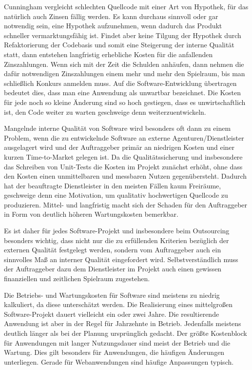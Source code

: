 Cunningham vergleicht schlechten Quellcode mit einer Art von Hypothek, für das natürlich auch Zinsen fällig werden. Es kann durchaus sinnvoll oder gar notwendig sein, eine Hypothek aufzunehmen, wenn dadurch das Produkt schneller vermarktungsfähig ist. Findet aber keine Tilgung der Hypothek durch Refaktorierung der Codebasis und somit eine Steigerung der interne Qualität statt, dann entstehen
langfristig erhebliche Kosten für die anfallenden Zinszahlungen. Wenn sich mit der Zeit die Schulden anhäufen, dann nehmen die dafür notwendigen Zinszahlungen einem mehr und mehr den Spielraum, bis
man schließlich Konkurs anmelden muss. Auf die Software-Entwicklung übertragen bedeutet dies, dass man eine Anwendung als unwartbar bezeichnet. Die Kosten für jede noch so kleine Änderung sind so hoch gestiegen, dass es unwirtschaftlich ist, den Code weiter zu warten geschweige denn weiterzuentwickeln.

Mangelnde interne Qualität von Software wird besonders oft dann zu einem Problem, wenn die zu entwickelnde Software an externe Agenturen/Dienstleister ausgelagert wird und der Auftraggeber primär an niedrigen Kosten und einer kurzen Time-to-Market gelegen ist. Da die Qualitätssicherung und insbesondere das Schreiben von Unit-Tests die Kosten im Projekt zunächst erhöht, ohne dass den Kosten einen unmittelbaren und messbaren Nutzen gegenübersteht. Dadurch hat der beauftragte Dienstleister in den meisten Fällen kaum Freiräume, geschweige denn eine Motivation, um qualitativ hochwertigen Quellcode zu produzieren. Mittel- und langfristig macht sich der Schaden für den Auftraggeber in Form von deutlich höheren Wartungskosten bemerkbar.

Es ist daher für jedes Software-Projekt und insbesondere beim Outsourcing besonders
wichtig, dass nicht nur die zu erfüllenden Kriterien bezüglich der externen Qualität festgelegt
werden, sondern vom Auftraggeber auch ein sinnvolles Maß an interner Qualität eingefordert wird. Selbstverständlich muss der Auftraggeber dazu dem Dienstleister im Projekt auch einen gewissen finanziellen und zeitlichen Spielraum zugestehen.

Die Betriebs- und Wartungskosten für Software sind meistens zu niedrig kalkuliert, da diese unterschätzt werden. Die Realisierung eines mittelgroßen Software-Projekt dauert vielleicht ein oder zwei Jahre. Die resultierende Anwendung ist aber in der Regel für Jahrzehnte in Betrieb. Jedenfalls meistens deutlich länger als bei der Planung ursprünglich gedacht.
Der größte Kostenblock für Anwendungen mit langer Nutzungsdauer sind meist der Betrieb und die Wartung. Dies gilt besonders für Anwendungen, die häufigen Änderungen unterliegen. Gerade für Webanwendungen
sind häufige Anpassungen typisch.

